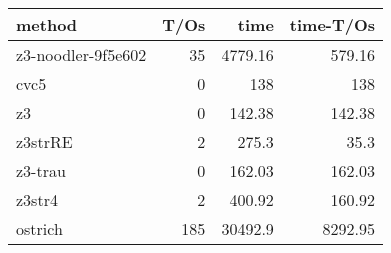 \begin{tabular}{lrrr}
\hline
 method             &   T/Os &     time &   time-T/Os \\
\hline
 z3-noodler-9f5e602 &     35 &  4779.16 &      579.16 \\
 cvc5               &      0 &   138    &      138    \\
 z3                 &      0 &   142.38 &      142.38 \\
 z3strRE            &      2 &   275.3  &       35.3  \\
 z3-trau            &      0 &   162.03 &      162.03 \\
 z3str4             &      2 &   400.92 &      160.92 \\
 ostrich            &    185 & 30492.9  &     8292.95 \\
\hline
\end{tabular}

